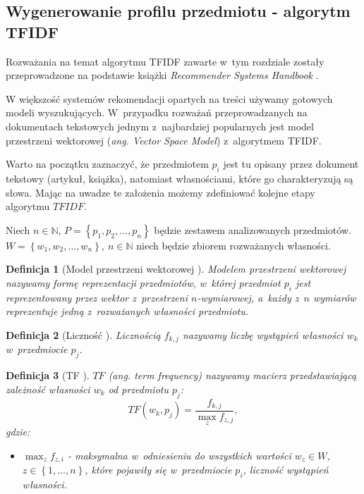 \documentclass[12pt,a4paper]{report}
\newtheorem{df}{Definicja}[chapter]
\newcommand{\set}[1]{\left\lbrace {#1} \right\rbrace}
\newcommand{\setN}{\mathbb{N}}
\newcommand{\setPrzedmioty}{\mathit{P}}
\newcommand{\setWlasnosci}{\mathit{W}}
\begin{document}
\subsection{Wygenerowanie profilu przedmiotu - algorytm TFIDF}
Rozważania na temat algorytmu TFIDF zawarte w~tym rozdziale zostały przeprowadzone na podstawie książki \textit{Recommender Systems Handbook} {\citep[Sec 3.3.1.1]{rsh}}.
\bigskip
\bigskip

W większość systemów rekomendacji opartych na treści używamy gotowych modeli wyszukujących. W~przypadku rozważań przeprowadzanych na dokumentach tekstowych jednym z~najbardziej popularnych jest model przestrzeni wektorowej (\textit{ang. Vector Space Model}) z~algorytmem TFIDF. 

Warto na początku zaznaczyć, że przedmiotem $p_i$ jest tu opisany przez dokument tekstowy (artykuł, książka), natomiast własnościami, które go charakteryzują są słowa. Mając na uwadze te założenia możemy zdefiniować kolejne etapy algorytmu $TFIDF$.
\bigskip

Niech $n\in \setN$, $\setPrzedmioty = \set{p_1, p_2, \ldots ,p_n}$ będzie zestawem analizowanych przedmiotów. $W = \set{w_1, w_2, \ldots ,w_n}, \: n\in \setN $ niech będzie zbiorem rozważanych własności.

\begin{df}[Model przestrzeni wektorowej {\citep[Sec 3.3.1.1]{rsh}}]
Modelem przestrzeni wektorowej nazywamy formę reprezentacji przedmiotów, w~której przedmiot $p_i$ jest reprezentowany przez wektor z~przestrzeni $n$-wymiarowej, a~każdy z~$n$ wymiarów reprezentuje jedną z~rozważanych własności przedmiotu. 
\end{df}

\begin{df}[Liczność {\citep[Sec 3.3.1.1]{rsh}}]
Licznością $f_{k,j}$ nazywamy liczbę wystąpień własności $w_k$ w~przedmiocie $p_j$.
\end{df}

\begin{df}[TF {\citep[Sec 3.3.1.1]{rsh}}]
$TF$ (ang. \textit{term frequency}) nazywamy macierz przedstawiającą zależność własności $w_k$ od przedmiotu $p_j$:
$$
TF(w_k, p_j)=\frac{f_{k,j}}{\max_{z}f_{z,j}},
$$
gdzie:
\begin{itemize}
\item $\max_{z}f_{z,i}$ - maksymalna w~odniesieniu do wszystkich wartości $w_z \in \setWlasnosci$, $z \in \set{1, \ldots, n}$, które pojawiły się w~przedmiocie $p_i$, liczność wystąpień własności. 
\end{itemize}
\end{df}
\end{document}
